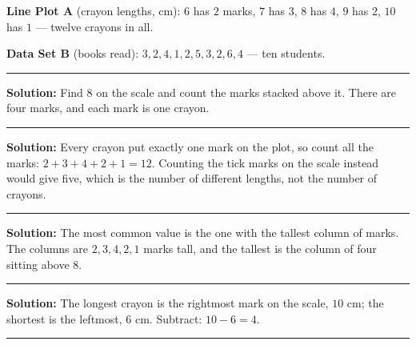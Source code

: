 \documentclass[12pt]{article}
\begin{document}


\noindent\textbf{Line Plot A} (crayon lengths, cm): $6$ has $2$ marks, $7$ has $3$, $8$ has $4$,
$9$ has $2$, $10$ has $1$ --- twelve crayons in all.\par
\noindent\textbf{Data Set B} (books read): $3, 2, 4, 1, 2, 5, 3, 2, 6, 4$ --- ten students.

\vspace{0.15cm}\noindent\rule{\linewidth}{0.4pt}


\textbf{Solution:} Find $8$ on the scale and count the marks stacked above it. There are four marks,
and each mark is one crayon. 

\vspace{0.15cm}\noindent\rule{\linewidth}{0.2pt}


\textbf{Solution:} Every crayon put exactly one mark on the plot, so count all the marks:
$2 + 3 + 4 + 2 + 1 = 12$. Counting the tick marks on the scale instead would give five, which is the
number of different lengths, not the number of crayons. 

\vspace{0.15cm}\noindent\rule{\linewidth}{0.2pt}


\textbf{Solution:} The most common value is the one with the tallest column of marks. The columns are
$2, 3, 4, 2, 1$ marks tall, and the tallest is the column of four sitting above $8$. 

\vspace{0.15cm}\noindent\rule{\linewidth}{0.2pt}


\textbf{Solution:} The longest crayon is the rightmost mark on the scale, $10$ cm; the shortest is the
leftmost, $6$ cm. Subtract: $10 - 6 = 4$. 

\vspace{0.15cm}\noindent\rule{\linewidth}{0.2pt}

\end{document}
